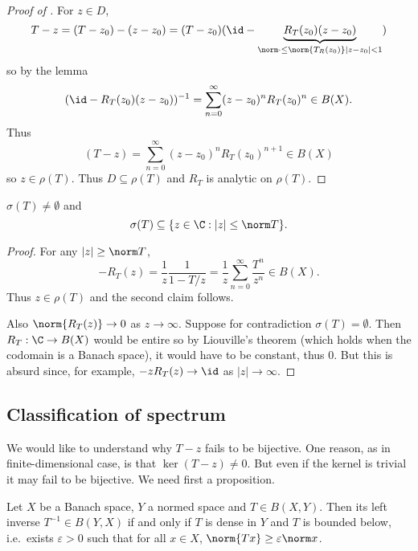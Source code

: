 \documentclass[a4paper]{article}
\begin{document}
\begin{proof}[Proof of ]
  For \(z \in D\),
  \[
    T - z
    = (T - z_0) - (z - z_0)
    = (T - z_0) (\id - \underbrace{R_T(z_0) (z - z_0)}_{\norm \cdot \leq \norm{T_R(z_0)} |z - z_0| < 1})
  \]
  so by the lemma
  \[
    (\id - R_T(z_0) (z - z_0))^{-1} = \sum_{n = 0}^\infty (z - z_0)^n R_T(z_0)^n \in B(X).
  \]
  Thus
  \[
    (T - z) = \sum_{n = 0}^\infty (z - z_0)^n R_T(z_0)^{n + 1} \in B(X)
  \]
  so \(z \in \rho(T)\). Thus \(D \subseteq \rho(T)\) and \(R_T\) is analytic on \(\rho(T)\).
\end{proof}

\begin{corollary}
  \(\sigma(T) \neq \emptyset\) and
  \[
    \sigma(T) \subseteq \{z \in \C: |z| \leq \norm T\}.
  \]
\end{corollary}

\begin{proof}
  For any \(|z| \geq \norm T\),
  \[
    - R_T(z) = \frac{1}{z} \frac{1}{1 - T/z} = \frac{1}{z} \sum_{n = 0}^\infty \frac{T^n}{z^n} \in B(X).
  \]
  Thus \(z \in \rho(T)\) and the second claim follows.

  Also \(\norm{R_T(z)} \to 0\) as \(z \to \infty\). Suppose for contradiction \(\sigma(T) = \emptyset\). Then \(R_T: \C \to B(X)\) would be entire so by Liouville's theorem (which holds when the codomain is a Banach space), it would have to be constant, thus \(0\). But this is absurd since, for example, \(-z R_T(z) \to \id\) as \(|z| \to \infty\).
\end{proof}

\subsection{Classification of spectrum}

We would like to understand why \(T - z\) fails to be bijective. One reason, as in finite-dimensional case, is that \(\ker(T - z) \neq 0\). But even if the kernel is trivial it may fail to be bijective. We need first a proposition.

\begin{proposition}
  Let \(X\) be a Banach space, \(Y\) a normed space and \(T \in B(X, Y)\). Then its left inverse \(T^{-1} \in B(Y, X)\) if and only if \(T\) is dense in \(Y\) and \(T\) is bounded below, i.e.\ exists \(\varepsilon > 0\) such that for all \(x \in X\), \(\norm{Tx} \geq \varepsilon \norm x\).
\end{proposition}
\end{document}
